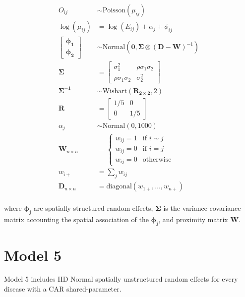 \documentclass[10pt,letterpaper]{article}
\begin{document}
\begin{align*}
O_{ij}                 &\sim \mbox{Poisson}(\mu_{ij})\\
\log(\mu_{ij})         &=    \log(E_{ij}) + \alpha_{j} + \phi_{ij}\\
\begin{bmatrix}
\boldsymbol{\phi_{1}}\\
\boldsymbol{\phi_{2}}
\end{bmatrix}           &\sim \mbox{Normal}(\mathbf{0}, \boldsymbol{\Sigma}\otimes(\boldsymbol{D}-\boldsymbol{W})^{-1})\\
\boldsymbol{\Sigma}        &= 
\begin{bmatrix}
\sigma^{2}_{1}             & \rho \sigma_{1} \sigma_{2}\\
\rho \sigma_{1} \sigma_{2} & \sigma^{2}_{2}             
\end{bmatrix}\\
\boldsymbol{\Sigma^{-1}} &\sim \mbox{Wishart}(\mathbf{R_{2\times2}},2)\\ 
\boldsymbol{R}             &= 
\begin{bmatrix}
1/5      &  0        \\
0        &  1/5             
\end{bmatrix}\\
\alpha_{j}              &\sim \mbox{Normal}(0,1000)\\
\boldsymbol{W}_{n \times n} &=
\left\{
\begin{array}{rl}
w_{ij} = 1 & \mbox{if } i \sim j \\
w_{ij} = 0 & \mbox{if } i = j    \\
w_{ij} = 0 & \mbox{otherwise}   
\end{array}
\right.\\
w_{i+}                      &=\sum_{j} w_{ij}\\
\boldsymbol{D}_{n \times n} &=\mbox{diagonal}(w_{1+},\dots,w_{n+})\\
\end{align*}

where $\boldsymbol{\phi_{j}}$ are spatially structured random effects, $\boldsymbol{\Sigma}$ is the variance-covariance matrix accounting the spatial association of the $\boldsymbol{\phi_{j}}$,  and proximity matrix $\boldsymbol{W}$.

\newpage

\section*{Model 5}
Model 5 includes IID Normal spatially unstructured random effects for every disease with a CAR shared-parameter.
\end{document}
